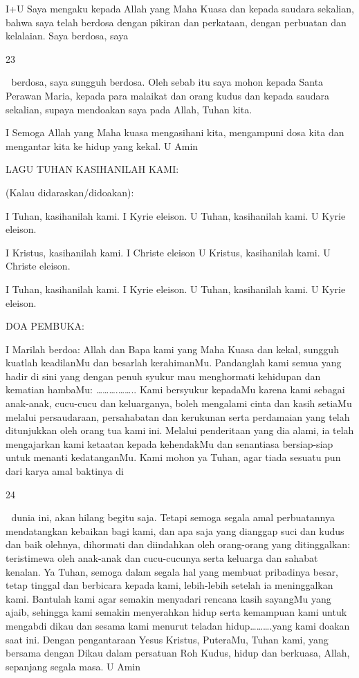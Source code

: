 \documentclass[10pt,a5paper,fancyhdr]{memoir}
\begin{document}
I+U Saya mengaku kepada Allah yang Maha Kuasa dan kepada 
saudara sekalian, bahwa saya telah berdosa dengan pikiran dan 
perkataan, dengan perbuatan dan kelalaian. Saya berdosa, saya 

23 



berdosa, saya sungguh berdosa. Oleh sebab itu saya mohon kepada 
Santa Perawan Maria, kepada para malaikat dan orang kudus dan 
kepada saudara sekalian, supaya mendoakan saya pada Allah, Tuhan 
kita. 

I Semoga Allah yang Maha kuasa mengasihani kita, mengampuni 
dosa kita dan mengantar kita ke hidup yang kekal. 
U Amin 

LAGU TUHAN KASIHANILAH KAMI: 

(Kalau didaraskan/didoakan): 

I Tuhan, kasihanilah kami. I Kyrie eleison. 
U Tuhan, kasihanilah kami. U Kyrie eleison. 

I Kristus, kasihanilah kami. I Christe eleison 
U Kristus, kasihanilah kami. U Christe eleison. 

I Tuhan, kasihanilah kami. I Kyrie eleison. 
U Tuhan, kasihanilah kami. U Kyrie eleison. 

DOA PEMBUKA: 

I Marilah berdoa: 
Allah dan Bapa kami yang Maha Kuasa dan kekal, sungguh kuatlah 
keadilanMu dan besarlah kerahimanMu. Pandanglah kami semua 
yang hadir di sini yang dengan penuh syukur mau menghormati 
kehidupan dan kematian hambaMu: ……….…….. Kami bersyukur 
kepadaMu karena kami sebagai anak-anak, cucu-cucu dan 
keluarganya, boleh mengalami cinta dan kasih setiaMu melalui 
persaudaraan, persahabatan dan kerukunan serta perdamaian yang 
telah ditunjukkan oleh orang tua kami ini. Melalui penderitaan yang 
dia alami, ia telah mengajarkan kami ketaatan kepada kehendakMu 
dan senantiasa bersiap-siap untuk menanti kedatanganMu. Kami 
mohon ya Tuhan, agar tiada sesuatu pun dari karya amal baktinya di 

24 



dunia ini, akan hilang begitu saja. Tetapi semoga segala amal 
perbuatannya mendatangkan kebaikan bagi kami, dan apa saja yang 
dianggap suci dan kudus dan baik olehnya, dihormati dan diindahkan 
oleh orang-orang yang ditinggalkan: teristimewa oleh anak-anak dan 
cucu-cucunya serta keluarga dan sahabat kenalan. Ya Tuhan, semoga 
dalam segala hal yang membuat pribadinya besar, tetap tinggal dan 
berbicara kepada kami, lebih-lebih setelah ia meninggalkan kami. 
Bantulah kami agar semakin menyadari rencana kasih sayangMu 
yang ajaib, sehingga kami semakin menyerahkan hidup serta 
kemampuan kami untuk mengabdi dikau dan sesama kami menurut 
teladan hidup……….yang kami doakan saat ini. Dengan 
pengantaraan Yesus Kristus, PuteraMu, Tuhan kami, yang bersama 
dengan Dikau dalam persatuan Roh Kudus, hidup dan berkuasa, 
Allah, sepanjang segala masa. 
U Amin 
\end{document}
